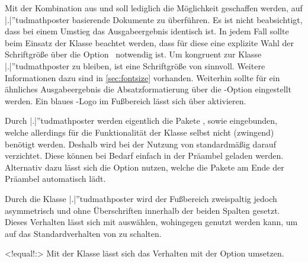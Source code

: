 \begin{DeclareEntity}{}
\begin{NoIndexDefault}
Mit der Kombination aus  und  soll 
lediglich die Möglichkeit geschaffen werden, auf \Class|.|''{tudmathposter} 
basierende Dokumente zu überführen. Es ist nicht beabsichtigt, dass bei einem 
Umstieg das Ausgabeergebnis identisch ist. In jedem Fall sollte beim Einsatz 
der Klasse  beachtet werden, dass für diese eine explizite 
Wahl der Schriftgröße über die Option~ notwendig ist. Um 
kongruent zur Klasse \Class|.|''{tudmathposter} zu bleiben, ist eine 
Schriftgröße von  sinnvoll. Weitere Informationen dazu sind 
in \autoref{sec:fontsize} vorhanden. Weiterhin sollte für ein ähnliches 
Ausgabeergebnis die Absatzformatierung über die \KOMAScript-Option 
 eingestellt werden. Ein blaues \DDC-Logo im Fußbereich 
lässt sich über  aktivieren.

\begin{Declaration}
  {}
\printdeclarationlist
%
Durch \Class|.|''{tudmathposter} werden eigentlich die Pakete , 
 sowie  eingebunden, welche allerdings für 
die Funktionalität der Klasse selbst nicht (zwingend) benötigt werden. Deshalb 
wird bei der Nutzung von  standardmäßig darauf verzichtet. 
Diese können bei Bedarf einfach in der Präambel geladen werden. Alternativ 
dazu lässt sich die Option  nutzen, welche die Pakete am 
Ende der Präambel automatisch lädt.
\end{Declaration}

\begin{Declaration}
  {}%
\printdeclarationlist
%
Durch die Klasse \Class|.|''{tudmathposter} wird der Fußbereich zweispaltig 
jedoch asymmetrisch und ohne Überschriften innerhalb der beiden Spalten 
gesetzt. Dieses Verhalten lässt sich mit  auswählen, 
wohingegen  genutzt werden kann, um auf das 
Standardverhalten von  zu schalten.
\end{Declaration}

\begin{Declaration}
  {}
  <!equal!:>
\printdeclarationlist
%
Mit der Klasse  lässt sich das Verhalten mit der Option 
 umsetzen.
\end{Declaration}


\end{NoIndexDefault}
\end{DeclareEntity}
